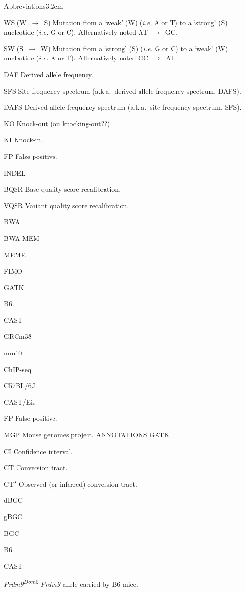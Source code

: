 \begin{mclistof}{Abbreviations}{3.2cm}
\item[WS (W~$\rightarrow$~S)] Mutation from a ‘weak’ (W) (\textit{i.e.} A or T) to a ‘strong’ (S) nucleotide (\textit{i.e.} G or C). Alternatively noted AT~$\rightarrow$~GC\@.
\item[SW (S~$\rightarrow$~W)] Mutation from a ‘strong’ (S) (\textit{i.e.} G or C) to a ‘weak’ (W) nucleotide (\textit{i.e.} A or T). Alternatively noted GC~$\rightarrow$~AT\@.
\item[DAF] Derived allele frequency.
\item[SFS] Site frequency spectrum (a.k.a.\ derived allele frequency spectrum, DAFS).
\item[DAFS] Derived allele frequency spectrum (a.k.a.\ site frequency spectrum, SFS).
\item[KO] Knock-out (ou knocking-out??)
\item[KI] Knock-in.
\item[FP] False positive.
\item[INDEL]
\item[BQSR] Base quality score recalibration.
\item[VQSR] Variant quality score recalibration.
\item[BWA]
\item[BWA-MEM]
\item[MEME]
\item[FIMO]
\item[GATK]
\item[B6]
\item[CAST]
\item[GRCm38]
\item[mm10]
\item[ChIP-seq]
\item[C57BL/6J]
\item[CAST/EiJ]
\item[FP] False positive.
\item[MGP] Mouse genomes project.
	ANNOTATIONS GATK
\item[CI] Confidence interval.
\item[CT] Conversion tract.
\item[CT\textsuperscript{$\star$}] Observed (or inferred) conversion tract.
\item[dBGC]
\item[gBGC]
\item[BGC]
\item[B6]
\item[CAST]
\item[\textit{Prdm9\textsuperscript{Dom2}}] \textit{Prdm9} allele carried by B6 mice.

\end{mclistof}
